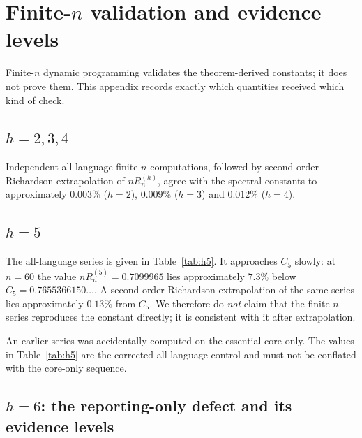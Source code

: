 \section{Finite-\texorpdfstring{\(n\)}{n} validation and evidence levels}
\label{app:B}

Finite-\(n\) dynamic programming validates the theorem-derived constants; it
does not prove them. This appendix records exactly which quantities received
which kind of check.

\subsection*{\texorpdfstring{\(h=2,3,4\)}{h=2,3,4}}

Independent all-language finite-\(n\) computations, followed by second-order
Richardson extrapolation of \(nR_n^{(h)}\), agree with the spectral constants
to approximately \(0.003\%\) (\(h=2\)), \(0.009\%\) (\(h=3\)) and \(0.012\%\)
(\(h=4\)).

\subsection*{\texorpdfstring{\(h=5\)}{h=5}}

The all-language series is given in Table~\ref{tab:h5}. It approaches \(C_5\)
slowly: at \(n=60\) the value \(nR_n^{(5)}=0.7099965\) lies approximately
\(7.3\%\) below \(C_5=0.7655366150\ldots\). A second-order Richardson
extrapolation of the same series lies approximately \(0.13\%\) from \(C_5\).
We therefore do \emph{not} claim that the finite-\(n\) series reproduces the
constant directly; it is consistent with it after extrapolation.

An earlier series was accidentally computed on the essential core only. The
values in Table~\ref{tab:h5} are the corrected all-language control and must
not be conflated with the core-only sequence.

\subsection*{\texorpdfstring{\(h=6\)}{h=6}: the reporting-only defect and its evidence levels}

